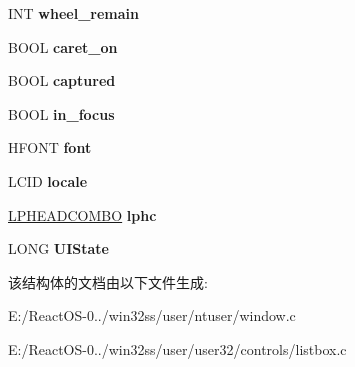 \begin{DoxyCompactItemize}
\mbox{\label{struct_l_b___d_e_s_c_r_ab00236dac9486dc21fd470c596ca432a}} 
I\+NT {\bfseries wheel\+\_\+remain}
\item 
\mbox{\label{struct_l_b___d_e_s_c_r_a0f5e67afba00593b00136b11e74cbac5}} 
B\+O\+OL {\bfseries caret\+\_\+on}
\item 
\mbox{\label{struct_l_b___d_e_s_c_r_a21a204b5001afb60c0980a8552dbc009}} 
B\+O\+OL {\bfseries captured}
\item 
\mbox{\label{struct_l_b___d_e_s_c_r_a397a0696a0938b904e5fbd6d873f36e6}} 
B\+O\+OL {\bfseries in\+\_\+focus}
\item 
\mbox{\label{struct_l_b___d_e_s_c_r_aa6c0c6cf60be68b831a57212eb32d5dd}} 
H\+F\+O\+NT {\bfseries font}
\item 
\mbox{\label{struct_l_b___d_e_s_c_r_af3de77cf9f124b409f83d339cd28b97c}} 
L\+C\+ID {\bfseries locale}
\item 
\mbox{\label{struct_l_b___d_e_s_c_r_a4de70904c03ae7ce64dea8c0e71901df}} 
\hyperlink{struct_h_e_a_d_c_o_m_b_o}{L\+P\+H\+E\+A\+D\+C\+O\+M\+BO} {\bfseries lphc}
\item 
\mbox{\label{struct_l_b___d_e_s_c_r_ac8520dc1dd6ebb3a2a950dd3aee3621f}} 
L\+O\+NG {\bfseries U\+I\+State}
\end{DoxyCompactItemize}


该结构体的文档由以下文件生成\+:\begin{DoxyCompactItemize}
\item 
E\+:/\+React\+O\+S-\/0../win32ss/user/ntuser/window.\+c\item 
E\+:/\+React\+O\+S-\/0../win32ss/user/user32/controls/listbox.\+c\end{DoxyCompactItemize}
